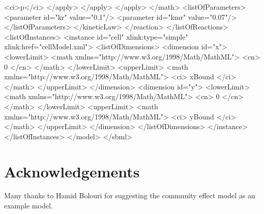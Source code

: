 \documentclass{cekarticle}
\begin{document}
\begin{example}
                                <ci>p</ci>
                            </apply>
                        </apply>    
                    </apply>
                </math>   
                <listOfParameters>
                    <parameter id="kr" value="0.1"/>
                    <parameter id="kmr" value="0.07"/>
                </listOfParameters>
            </kineticLaw>
        </reaction>
    </listOfReactions>
    <listOfInstances>
        <instance id="cell" xlink:type="simple" xlink:href="cellModel.xml">
            <listOfDimensions>
                <dimension id="x">
                    <lowerLimit>
                        <math xmlns="http://www.w3.org/1998/Math/MathML">
                            <cn> 0 </cn>
                        </math>
                    </lowerLimit>
                    <upperLimit>
                        <math xmlns="http://www.w3.org/1998/Math/MathML">
                            <ci> xBound </ci>
                        </math>
                    </upperLimit>
                </dimension>
                <dimension id="y">
                    <lowerLimit>
                        <math xmlns="http://www.w3.org/1998/Math/MathML">
                            <cn> 0 </cn>
                        </math>
                    </lowerLimit>
                    <upperLimit>
                        <math xmlns="http://www.w3.org/1998/Math/MathML">
                            <ci> yBound </ci>
                        </math>
                    </upperLimit>
                </dimension>
            </listOfDimensions>
        </instance>
    </listOfInstances>
</model>
</sbml>
\end{example}

\section{Acknowledgements}

Many thanks to Hamid Bolouri for suggesting the community effect model as an example model.




\end{document}
